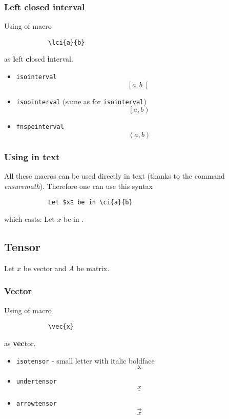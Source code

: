 \documentclass{article}
\begin{document}
		\subsubsection*{Left closed interval}
		Using of macro
		\begin{lstlisting}
			\lci{a}{b}
		\end{lstlisting}
		as \textbf{l}eft \textbf{c}losed \textbf{i}nterval.
		
		\begin{itemize}
			\item \texttt{isointerval}
			\begin{equation*}
			\left[ a , b \right[
			\end{equation*}
			\item \texttt{isoointerval} (same as for \texttt{isointerval})
			\begin{equation*}
			\left[ a , b \right)
			\end{equation*}
			\item \texttt{fnspeinterval}
			\begin{equation*}
			\left< a , b \right)
			\end{equation*}
		\end{itemize}
	
		\subsubsection*{Using in text}
		All these macros can be used directly in text (thanks to the command \textit{ensuremath}). Therefore one can use this syntax
		\begin{lstlisting}
			Let $x$ be in \ci{a}{b}
		\end{lstlisting}
		which casts: Let $x$ be in .
	
	\subsection*{Tensor}
		Let $x$ be vector and $A$ be matrix.
	
		\subsubsection*{Vector}
		Using of macro
		\begin{lstlisting}
			\vec{x}
		\end{lstlisting}
		as \textbf{vec}tor.
		
		\begin{itemize}
			\item \texttt{isotensor} - small letter with italic boldface
			\begin{equation*}
				\bm{\mathrm{x}}
			\end{equation*}
			\item \texttt{undertensor}
			\begin{equation*}
				\underline{x}
			\end{equation*}
			\item \texttt{arrowtensor}
			\begin{equation*}
				\vec x
			\end{equation*}
		\end{itemize}
	
\end{document}
